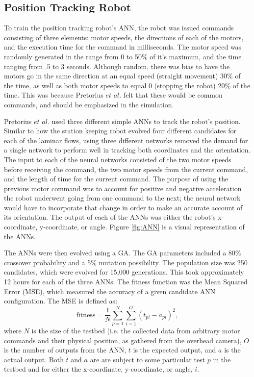 \documentclass{sig-alternate}
\begin{document}
  \subsection{Position Tracking Robot}\label{Pretorius Evolving}
  To train the position tracking robot's ANN, the robot was issued commands ~\cite{Pretorius:2009:TAN:1632149.1632171}  consisting of three elements: motor speeds, the directions of each of the motors, and the execution time for the command in milliseconds. The motor speed was randomly generated in the range from 0 to 50\% of it's maximum, and the time ranging from .5 to 3 seconds. Although random, there was bias to have the motors go in the same direction at an equal speed (straight movement) 30\% of the time, as well as both motor speeds to equal 0 (stopping the robot) 20\% of the time. This was because  Pretorius $et$ $al.$ felt that these would be common commands, and should be emphasized in the simulation.
  
  Pretorius $et$ $al.$ used three different simple ANNs to track the robot's position. Similar to how the station keeping robot evolved four different candidates for each of the laminar flows, using three different networks removed the demand for a single network to perform well in tracking both coordinates and the orientation. The input to each of the neural networks consisted of the two motor speeds before receiving the command, the two motor speeds from the current command, and the length of time for the current command. The purpose of using the previous motor command was to account for positive and negative acceleration the robot underwent going from one command to the next; the neural network would have to incorporate that change in order to make an accurate account of its orientation. The output of each of the ANNs was either the robot's x-coordinate, y-coordinate, or angle. Figure \ref{fig:ANN} is a visual representation of the ANNs.
 

  The ANNs were then evolved using a GA. The GA parameters included a 80\% crossover probability and a 5\% mutation possibility. The population size was 250 candidates, which were evolved for 15,000 generations. This took approximately 12 hours for each of the three ANNs. The fitness function was the Mean Squared Error (MSE), which measured the accuracy of a given candidate ANN configuration. The MSE is defined as:
  \[
  \textrm{fitness} = \frac{1}{N}\sum\limits_{p=1}^N\sum\limits_{i=1}^O (t_{pi} - a_{pi})^2,
\] 
where $N$ is the size of the testbed (i.e. the collected data from arbitrary motor commands and their physical position, as gathered from the overhead camera), $O$ is the number of outputs from the ANN, $t$ is the expected output, and $a$ is the actual output. Both $t$ and $a$ are are subject to some particular test $p$ in the testbed and for either the x-coordinate, y-coordinate, or angle, $i$.
  
\end{document}
